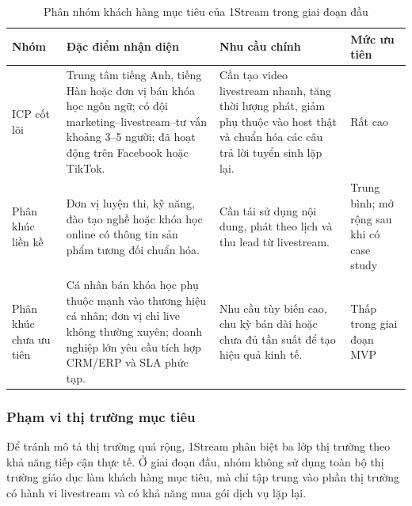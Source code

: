 \begin{table}[H]
    \centering
    \small
    \setlength{\tabcolsep}{4pt}
    \renewcommand{\arraystretch}{1.25}
    \caption{Phân nhóm khách hàng mục tiêu của 1Stream trong giai đoạn đầu}
    \label{tab:phan-khuc-1stream}
    \begin{tabularx}{\linewidth}{@{}L{3.4cm}L{2.5cm}Y L{2cm}@{}}
        \toprule
        \textbf{Nhóm} & \textbf{Đặc điểm nhận diện} &
        \textbf{Nhu cầu chính} & \textbf{Mức ưu tiên} \\ \midrule
        ICP cốt lõi & Trung tâm tiếng Anh, tiếng Hàn hoặc đơn vị bán khóa học
        ngôn ngữ; có đội marketing--livestream--tư vấn khoảng 3--5 người; đã
        hoạt động trên Facebook hoặc TikTok. &
        Cần tạo video livestream nhanh, tăng thời lượng phát, giảm phụ thuộc vào
        host thật và chuẩn hóa các câu trả lời tuyển sinh lặp lại. &
        Rất cao \\ 
        Phân khúc liền kề & Đơn vị luyện thi, kỹ năng, đào tạo nghề hoặc khóa học
        online có thông tin sản phẩm tương đối chuẩn hóa. &
        Cần tái sử dụng nội dung, phát theo lịch và thu lead từ livestream. &
        Trung bình; mở rộng sau khi có case study \\ 
        Phân khúc chưa ưu tiên & Cá nhân bán khóa học phụ thuộc mạnh vào thương
        hiệu cá nhân; đơn vị chỉ live không thường xuyên; doanh nghiệp lớn yêu
        cầu tích hợp CRM/ERP và SLA phức tạp. &
        Nhu cầu tùy biến cao, chu kỳ bán dài hoặc chưa đủ tần suất để tạo hiệu
        quả kinh tế. &
        Thấp trong giai đoạn MVP \\ \bottomrule
    \end{tabularx}
\end{table}

\subsubsection{Phạm vi thị trường mục tiêu}

Để tránh mô tả thị trường quá rộng, 1Stream phân biệt ba lớp thị trường theo khả
năng tiếp cận thực tế. Ở giai đoạn đầu, nhóm không sử dụng toàn bộ thị trường giáo
dục làm khách hàng mục tiêu, mà chỉ tập trung vào phần thị trường có hành vi
livestream và có khả năng mua gói dịch vụ lặp lại.

